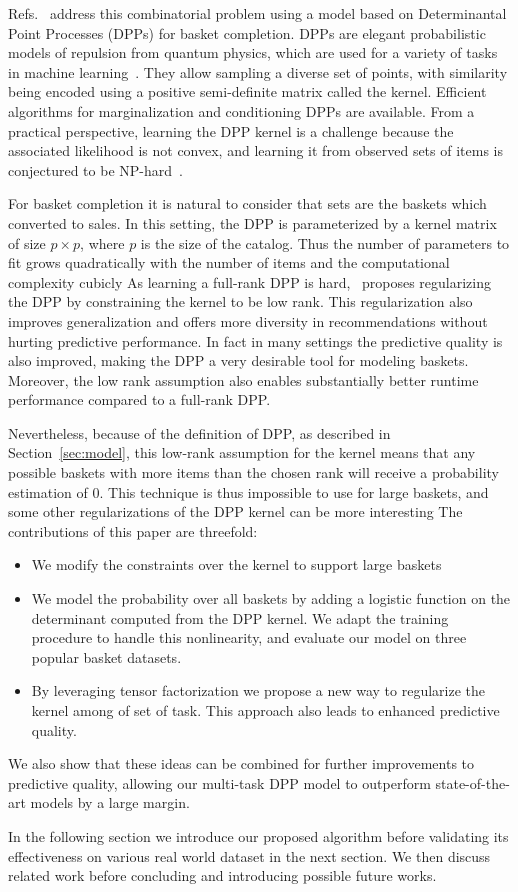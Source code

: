 Refs.~\cite{DBLP:conf/aaai/GartrellPK17,DBLP:conf/recsys/GartrellPK16} address this
combinatorial problem using a model based on Determinantal Point Processes
(DPPs) for basket completion. DPPs are elegant probabilistic models of repulsion
from quantum physics, which are used for a variety of tasks in machine
learning~\cite{DBLP:conf/icml/GautierBV17,Kulesza:2012:DPP:2481023,Foulds2013DiversePW}.
They allow sampling a diverse set of points, with similarity being encoded
using a positive semi-definite matrix called the kernel.  Efficient algorithms
for marginalization and conditioning DPPs are available. From a practical
perspective, learning the DPP kernel is a challenge because the associated
likelihood is not convex, and learning it from observed sets of items is
conjectured to be NP-hard~\cite{Kulesza:2012:DPP:2481023}.

For basket completion it is natural to consider that sets are the baskets which
converted to sales. In this setting, the DPP is parameterized by a kernel matrix of
size $p \times p$, where $p$ is the size of the catalog. 
Thus the number of parameters to fit grows quadratically with 
the number of items and the computational complexity cubicly
As learning a full-rank
DPP is hard,~\cite{DBLP:conf/aaai/GartrellPK17} proposes regularizing the DPP by
constraining the kernel to be low rank. This regularization also improves
generalization and offers more diversity in recommendations without hurting
predictive performance. In fact in many settings the predictive quality is also
improved, making the DPP a very desirable tool for modeling baskets. Moreover,
the low rank assumption also enables substantially better runtime performance
compared to a full-rank DPP.

Nevertheless, because of the definition of DPP, as described in
Section~\ref{sec:model}, this low-rank assumption for the kernel means that any
possible baskets with more items than the chosen rank will receive a
probability estimation of $0$. This technique is thus impossible to use for
large baskets, and some other regularizations of the DPP kernel can be more
interesting The contributions of this paper are threefold:
\begin{itemize}
	\item We modify the constraints over the kernel to support large baskets
    \item We model the probability over all baskets by adding a logistic
    function on the determinant computed from the DPP kernel. We adapt the
    training procedure to handle this nonlinearity, and evaluate our model
    on three popular basket datasets.
    \item By leveraging tensor factorization we propose a new way to regularize the kernel among of set of task. 
    This approach also leads to enhanced predictive quality.
 \end{itemize}
We also show that these ideas can be combined for further improvements to
predictive quality, allowing our multi-task DPP model to outperform
state-of-the-art models by a large margin.

In the following section we introduce our proposed algorithm before validating its effectiveness on various real world dataset in the next section. 
We then discuss related work before concluding and introducing possible future works. 
